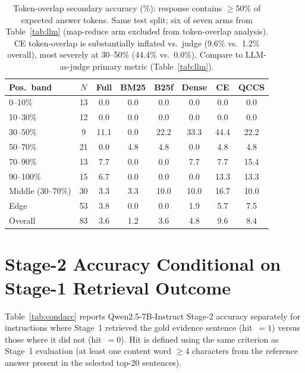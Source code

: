 \documentclass{article}
\begin{document}
\begin{table}[H]
\centering
\caption{Token-overlap secondary accuracy (\%): response contains $\geq$50\%
  of expected answer tokens. Same test split; six of seven arms from Table~\ref{tab:llm}
  (map-reduce arm excluded from token-overlap analysis).
  CE token-overlap is substantially inflated vs.\ judge (9.6\% vs.\ 1.2\% overall),
  most severely at 30--50\% (44.4\% vs.\ 0.0\%). Compare to LLM-as-judge
  primary metric (Table~\ref{tab:llm}).}
\label{tab:tokoverlap}
\small
\setlength{\tabcolsep}{3pt}
\begin{tabular}{@{}lc cccccc@{}}
\toprule
Pos.\ band & $N$ & Full & BM25 & B25f & Dense & CE & QCCS \\
\midrule
0--10\%   & 13 &  0.0 &  0.0 &  0.0 &  0.0 &  0.0 &  0.0 \\
10--30\%  & 12 &  0.0 &  0.0 &  0.0 &  0.0 &  0.0 &  0.0 \\
30--50\%  &  9 & 11.1 &  0.0 & 22.2 & 33.3 & 44.4 & 22.2 \\
50--70\%  & 21 &  0.0 &  4.8 &  4.8 &  0.0 &  4.8 &  4.8 \\
70--90\%  & 13 &  7.7 &  0.0 &  0.0 &  7.7 &  7.7 & 15.4 \\
90--100\% & 15 &  6.7 &  0.0 &  0.0 &  0.0 & 13.3 & 13.3 \\
\midrule
Middle (30--70\%) & 30 & 3.3 & 3.3 & 10.0 & 10.0 & 16.7 & 10.0 \\
Edge              & 53 & 3.8 & 0.0 &  0.0 &  1.9 &  5.7 &  7.5 \\
Overall           & 83 & 3.6 & 1.2 &  3.6 &  4.8 &  9.6 &  8.4 \\
\bottomrule
\end{tabular}
\end{table}


\section{Stage-2 Accuracy Conditional on Stage-1 Retrieval Outcome}
\label{app:condacc}

Table~\ref{tab:condacc} reports Qwen2.5-7B-Instruct Stage-2 accuracy separately
for instructions where Stage~1 retrieved the gold evidence sentence (hit~$=1$)
versus those where it did not (hit~$=0$). Hit is defined using the same criterion
as Stage~1 evaluation (at least one content word $\geq$4 characters from the
reference answer present in the selected top-20 sentences).
\end{document}
